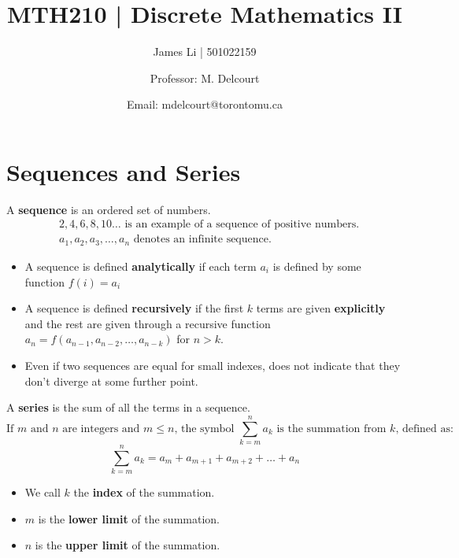 \documentclass[a4paper]{article}
\title{MTH210 | Discrete Mathematics II}
\author{James Li | 501022159 \and Professor: M. Delcourt\and Email: mdelcourt@torontomu.ca}
\date{}
\begin{document}
  \maketitle
  \tableofcontents
  \newpage
  \section{Sequences and Series} 
    A \textbf{sequence} is an ordered set of numbers.
    \begin{displaymath}
      \begin{split}
        &2,4,6,8,10\dots \textrm{ is an example of a sequence of positive numbers.} \\
        &a_1,a_2,a_3,\dots,a_n \textrm{ denotes an infinite sequence.}
      \end{split}
    \end{displaymath}
    \begin{itemize}
      \item A sequence is defined \textbf{analytically} if each term $a_i$ is defined by some function $f(i) = a_i$
      \item A sequence is defined \textbf{recursively} if the first $k$ terms are given \textbf{explicitly} and the rest are given through a recursive function $a_n = f(a_{n-1},a_{n-2},\dots,a_{n-k})$ for $n >k$.
      \item Even if two sequences are equal for small indexes, does not indicate that they don't diverge at some further point.
    \end{itemize}
    A \textbf{series} is the sum of all the terms in a sequence.
    \begin{displaymath}
      \textrm{If $m$ and $n$ are integers and $m \le n$, the symbol $\sum_{k=m}^n a_k$ is the summation from $k$, defined as:}
    \end{displaymath}
     $$ 
        \sum_{k=m}^n a_k = a_m+ a_{m+1}+ a_{m+2} + \dots + a_{n}
     $$
    \begin{itemize}
      \item We call $k$ the \textbf{index} of the summation.
      \item $m$ is the \textbf{lower limit} of the summation.
      \item $n$ is the \textbf{upper limit} of the summation.
    \end{itemize}
\end{document}
